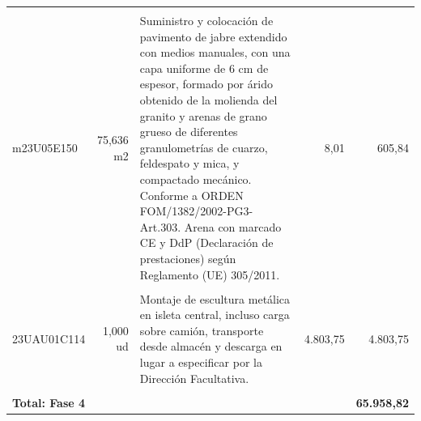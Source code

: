 \documentclass{book}%
\begin{document}
\begin{longtable}{lrlrr}
&&&&\\%
m23U05E150&    75,636 m2&\multicolumn{1}{p{5cm}}{Suministro y colocación de pavimento de jabre extendido con medios manuales, con una capa uniforme de 6 cm de espesor, formado por árido obtenido de la molienda del granito y arenas de grano grueso de diferentes granulometrías de cuarzo, feldespato y mica, y compactado mecánico. Conforme a ORDEN FOM/1382/2002{-}PG3{-}Art.303. Arena con marcado CE y DdP (Declaración de prestaciones) según Reglamento (UE) 305/2011.}&      8,01&605,84\\%
&&&&\\%
23UAU01C114&     1,000 ud&\multicolumn{1}{p{5cm}}{Montaje de escultura metálica en isleta central, incluso carga sobre camión, transporte desde almacén y descarga en lugar a especificar por la Dirección Facultativa.}&  4.803,75&4.803,75\\%
&&&&\\%
\multicolumn{4}{p{8cm}}{\textbf{Total: Fase 4}}&\textbf{65.958,82}\\%
\end{longtable}%
\normalsize

%
\end{document}
